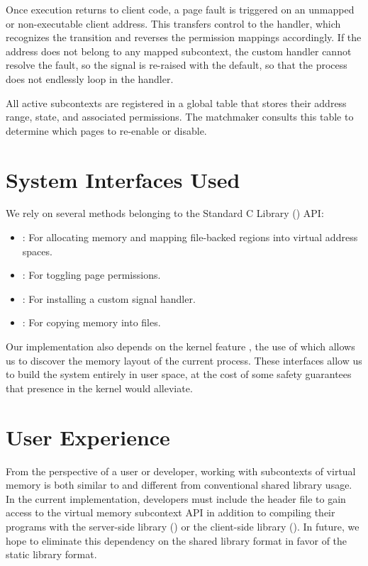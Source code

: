 Once execution returns to client code, a page fault is triggered on an unmapped or non-executable client address. This transfers control to the  handler, which recognizes the transition and reverses the permission mappings accordingly. If the address does not belong to any mapped subcontext, the custom handler cannot resolve the fault, so the  signal is re-raised with the default, so that the process does not endlessly loop in the handler.

All active subcontexts are registered in a global table that stores their address range, state, and associated permissions. The matchmaker consults this table to determine which pages to re-enable or disable.

\section*{System Interfaces Used}
We rely on several methods belonging to the Standard C Library () API:
\begin{itemize}
    \item {}: For allocating memory and mapping file-backed regions into virtual address spaces.
    \item {}: For toggling page permissions.
    \item {}: For installing a custom signal handler.
    \item {}: For copying memory into files.
\end{itemize}

Our implementation also depends on the kernel feature , the use of which allows us to discover the memory layout of the current process. These interfaces allow us to build the system entirely in user space, at the cost of some safety guarantees that presence in the kernel would alleviate.

\section*{User Experience}
From the perspective of a user or developer, working with subcontexts of virtual memory is both similar to and different from conventional shared library usage. In the current implementation, developers must include the header file  to gain access to the virtual memory subcontext API in addition to compiling their programs with the server-side library () or the client-side library (). In future, we hope to eliminate this dependency on the shared library format in favor of the static library format.


